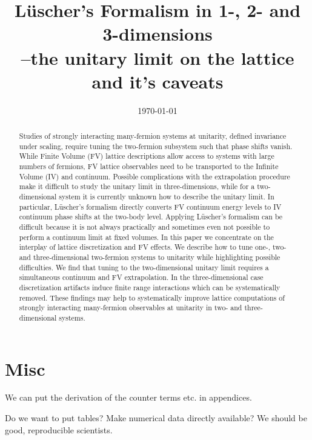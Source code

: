 \documentclass[aps,superscriptaddress,tightenlines,nofootinbib,floatfix,longbibliography,notitlepage]{revtex4-1}
\begin{document}
\title{L\"{u}scher's Formalism in 1-, 2- and 3-dimensions\\--the unitary limit on the lattice and it's caveats}





\date{\today}

\begin{abstract}
Studies of strongly interacting many-fermion systems at unitarity, defined invariance under scaling, require tuning the two-fermion subsystem such that phase shifts vanish.
While Finite Volume (FV) lattice descriptions allow access to systems with large numbers of fermions, FV lattice observables need to be transported to the Infinite Volume (IV) and continuum.
Possible complications with the extrapolation procedure make it difficult to study the unitary limit in three-dimensions, while for a two-dimensional system it is currently unknown how to describe the unitary limit.
In particular, L\"{u}scher's formalism directly converts FV continuum energy levels to IV continuum phase shifts at the two-body level.
Applying L\"{u}scher's formalism can be difficult because it is not always practically and sometimes even not possible to perform a continuum limit at fixed volumes.
In this paper we concentrate on the interplay of lattice discretization and FV effects.
We describe how to tune one-, two- and three-dimensional two-fermion systems to unitarity while highlighting possible difficulties.
We find that tuning to the two-dimensional unitary limit requires a simultaneous continuum and FV extrapolation.
In the three-dimensional case discretization artifacts induce finite range interactions which can be systematically removed.
These findings may help to systematically improve lattice computations of strongly interacting many-fermion observables at unitarity in two- and three-dimensional systems.
\end{abstract}

\maketitle




%






\appendix
\section{Misc}

We can put the derivation of the counter terms etc. in appendices.

Do we want to put tables?  Make numerical data directly available?  We should be good, reproducible scientists.









\end{document}
